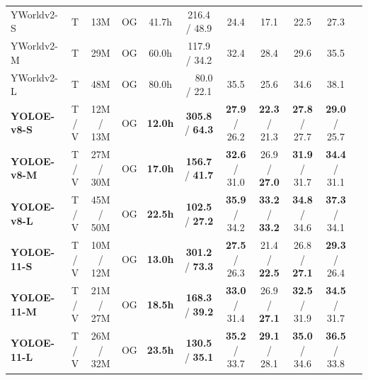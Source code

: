 \documentclass[10pt,twocolumn,letterpaper]{article}
\begin{document}
\begin{table}[t]
\begin{tabular}{l>{\hspace{-8pt}}c<{\hspace{-3pt}}c>{\hspace{-5pt}}c>{\hspace{-5pt}}ccccccc}
YWorldv2-S~\cite{cheng2024yoloworld} & T & 13M & OG & 41.7h & 216.4 / 48.9 & 24.4 & 17.1 & 22.5 & 27.3 \\
YWorldv2-M~\cite{cheng2024yoloworld} & T & 29M & OG & 60.0h & 117.9 / 34.2 & 32.4 & 28.4 & 29.6 & 35.5 \\
YWorldv2-L~\cite{cheng2024yoloworld} & T & 48M & OG & 80.0h & ~~80.0 / 22.1 & 35.5 & 25.6 & 34.6 & 38.1 \\
\midrule
\textbf{YOLOE-v8-S} & T / V & 12M / 13M & OG & \textbf{12.0h} & \textbf{305.8} / \textbf{64.3} & \textbf{27.9} / 26.2 & \textbf{22.3} / 21.3 & \textbf{27.8} / 27.7 & \textbf{29.0} / 25.7 \\
\textbf{YOLOE-v8-M} & T / V & 27M / 30M & OG & \textbf{17.0h} & \textbf{156.7} / \textbf{41.7} & \textbf{32.6} / 31.0 & 26.9 / \textbf{27.0} & \textbf{31.9} / 31.7 & \textbf{34.4} / 31.1 \\
\textbf{YOLOE-v8-L} & T / V & 45M / 50M & OG & \textbf{22.5h} & \textbf{102.5} / \textbf{27.2} & \textbf{35.9} / 34.2 & \textbf{33.2} / \textbf{33.2} & \textbf{34.8} / 34.6 & \textbf{37.3} / 34.1 \\
\textbf{YOLOE-11-S} & T / V & 10M / 12M & OG & \textbf{13.0h} & \textbf{301.2} / \textbf{73.3} & \textbf{27.5} / 26.3 & 21.4 / \textbf{22.5} & 26.8 / \textbf{27.1} & \textbf{29.3} / 26.4 \\
\textbf{YOLOE-11-M} & T / V & 21M / 27M & OG & \textbf{18.5h} & \textbf{168.3} / \textbf{39.2} & \textbf{33.0} / 31.4 & 26.9 / \textbf{27.1} & \textbf{32.5} / 31.9 & \textbf{34.5} / 31.7 \\
\textbf{YOLOE-11-L} & T / V & 26M / 32M & OG & \textbf{23.5h} & \textbf{130.5} / \textbf{35.1} & \textbf{35.2} / 33.7 & \textbf{29.1} / 28.1 & \textbf{35.0} / 34.6 & \textbf{36.5} / 33.8 \\ 
\bottomrule
\end{tabular}
\vspace{-10pt}
\end{table}
\end{document}
